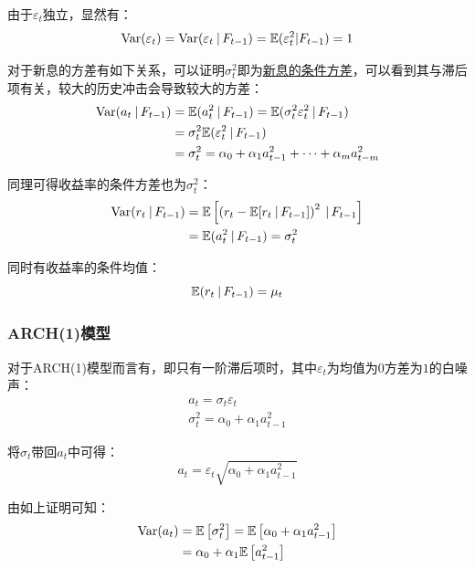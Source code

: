 \documentclass[11pt]{article}
\begin{document}
由于$\varepsilon_t$独立，显然有：
\begin{equation*}
    \operatorname{Var}(\varepsilon_t) = \operatorname{Var}(\varepsilon_t \:\vert\, F_{t-1}) = \mathbb{E}(\varepsilon_{t}^{2} | F_{t-1}) = 1
\end{equation*}

对于新息的方差有如下关系，可以证明$\sigma_{t}^{2}$即为\uline{新息的条件方差}，可以看到其与滞后项有关，较大的历史冲击会导致较大的方差：
\begin{align*}
    \operatorname{Var}(a_t \:\vert\, F_{t-1})
    &= \mathbb{E}(a_{t}^{2} \:\vert\, F_{t-1})
    = \mathbb{E}(\sigma_{t}^{2} \varepsilon_{t}^{2} \:\vert\, F_{t-1}) \\
    &= \sigma_{t}^{2} \mathbb{E}(\varepsilon_{t}^{2} \:\vert\, F_{t-1}) \\
    &= \sigma_{t}^{2} = \alpha_0 + \alpha_1 a_{t-1}^2 + \dots + \alpha_m a_{t-m}^2
\end{align*}

同理可得收益率的条件方差也为$\sigma_{t}^{2}$：
\begin{align*}
    \operatorname{Var}(r_t \:\vert\, F_{t-1}) &= \mathbb{E}\left[ \left( r_t - \mathbb{E}[r_t \:\vert\, F_{t-1}] \right)^2 \:\vert\, F_{t-1} \right] \\
    &= \mathbb{E}(a_{t}^{2} \:\vert\, F_{t-1}) = \sigma_{t}^{2}
\end{align*}

同时有收益率的条件均值：
\begin{equation*}
    \mathbb{E}(r_t \:\vert\, F_{t-1}) = \mu_t
\end{equation*}

\subsubsection{ARCH(1)模型}

对于ARCH(1)模型而言有，即只有一阶滞后项时，其中$\varepsilon_t$为均值为$0$方差为$1$的白噪声：
\begin{gather*}
    a_t = \sigma_t \varepsilon_t \\
    \sigma_{t}^{2} = \alpha_0 + \alpha_1 a_{t-1}^{2}
\end{gather*}

将$\sigma_t$带回$a_t$中可得：
\begin{equation*}
    a_t = \varepsilon_t \sqrt{\alpha_0 + \alpha_1 a_{t-1}^{2}}
\end{equation*}

由如上证明可知：
\begin{align*}
    \operatorname{Var}(a_t) &= \mathbb{E}\left[\sigma_{t}^{2}\right]
    = \mathbb{E}\left[ \alpha_0 + \alpha_1 a_{t-1}^{2} \right] \\
    &= \alpha_0 + \alpha_1 \mathbb{E}\left[a_{t-1}^{2}\right]
\end{align*}
\end{document}
